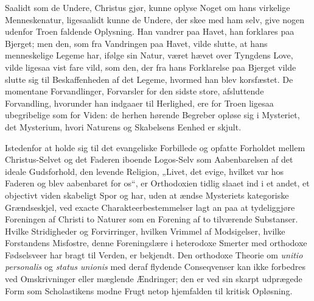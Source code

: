 \documentclass[12pt]{book}
\begin{document}
Saalidt som de Undere, Christus gjør, kunne oplyse Noget om hans
virkelige Menneskenatur, ligesaalidt kunne de Undere, der skee med
ham selv, give nogen udenfor Troen faldende Oplysning. Han vandrer
paa Havet, han forklares paa Bjerget; men den, som fra Vandringen
paa Havet, vilde slutte, at hans menneskelige Legeme har, ifølge sin
Natur, været hævet over Tyngdens Love, vilde ligesaa vist fare vild,
som den, der fra hans Forklarelse paa Bjerget vilde slutte sig til
Beskaffenheden af det Legeme, hvormed han blev korsfæstet. De
momentane Forvandlinger, Forvarsler for den sidste store,
afsluttende Forvandling, hvorunder han indgaaer til Herlighed, ere
for Troen ligesaa ubegribelige som for Viden: de herhen hørende
Begreber opløse sig i Mysteriet, det Mysterium, hvori Naturens og
Skabelsens Eenhed er skjult.

Istedenfor at holde sig til det evangeliske Forbillede og opfatte
Forholdet mellem Christus-Selvet og det Faderen iboende Logos-Selv
som Aabenbarelsen af det ideale Gudsforhold, den levende Religion,
„Livet, det evige, hvilket var hos Faderen og blev aabenbaret for
os“, er Orthodoxien tidlig slaaet ind i et andet, et objectivt
viden\-
skabeligt Spor og har, uden at ændse Mysteriets kategoriske
Grændseskjel, ved exacte Charakteerbestemmelser lagt an paa at
tydeliggjøre Foreningen af Christi to Naturer som en Forening af to
tilværende Substanser. Hvilke Stridigheder og Forvirringer, hvilken
Vrimmel af Modsigelser, hvilke Forstandens Misfostre, denne
Foreningslære i heterodoxe Smerter med orthodoxe Fødselsveer har
bragt til Verden, er bekjendt. Den orthodoxe Theorie om
\textit{unitio personalis} og \textit{status unionis} med deraf
flydende Conseqvenser kan ikke forbedres ved Omskrivninger eller
mæglende Ændringer; den er ved sin skarpt udprægede Form som
Scholastikens modne Frugt netop hjemfalden til kritisk Opløsning.
\end{document}
